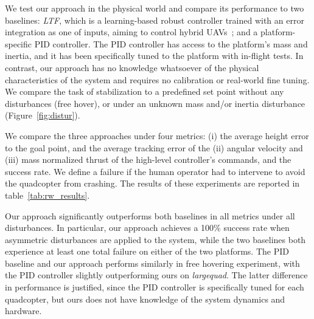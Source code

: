 We test our approach in the physical world and compare its performance to two baselines: \emph{LTF}, which is a learning-based robust controller trained with an error integration as one of inputs, aiming to control hybrid UAVs~\cite{LTF}; and a platform-specific PID controller.
%
The PID controller has access to the platform's mass and inertia, and it has been specifically tuned to the platform with in-flight tests.
%
In contrast, our approach has no knowledge whatsoever of the physical characteristics of the system and requires no calibration or real-world fine tuning.
%
We compare the task of stabilization to a predefined set point without any disturbances (free hover), or under an unknown mass and/or inertia disturbance (Figure~\ref{fig:distur}).
%

We compare the three approaches under four metrics: (i) the average height error to the goal point, and the average tracking error of the (ii) angular velocity and (iii) mass normalized thrust of the high-level controller's commands, and the success rate.
%
We define a failure if the human operator had to intervene to avoid the quadcopter from crashing.
%
The results of these experiments are reported in table~\ref{tab:rw_results}.
%

Our approach significantly outperforms both baselines in all metrics under all disturbances. In particular, our approach achieves a 100\% success rate when asymmetric disturbances are applied to the system, while the two baselines both experience at least one total failure on either of the two platforms. 
%
The PID baseline and our approach performs similarly in free hovering experiment, with the PID controller slightly outperforming ours on \emph{largequad}.  
%
The latter difference in performance is justified, since the PID controller is specifically tuned for each quadcopter, but ours does not have knowledge of the system dynamics and hardware. 
%
%
%
%
%


